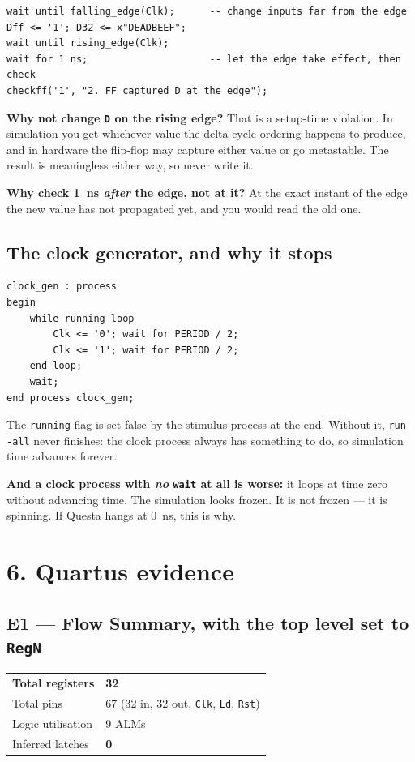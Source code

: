 \documentclass[11pt]{article}
\newcommand{\code}[1]{\texttt{#1}}
\begin{document}
\begin{lstlisting}
wait until falling_edge(Clk);      -- change inputs far from the edge
Dff <= '1'; D32 <= x"DEADBEEF";
wait until rising_edge(Clk);
wait for 1 ns;                     -- let the edge take effect, then check
checkff('1', "2. FF captured D at the edge");
\end{lstlisting}

\textbf{Why not change \code{D} on the rising edge?} That is a setup-time
violation. In simulation you get whichever value the delta-cycle ordering happens
to produce, and in hardware the flip-flop may capture either value or go
metastable. The result is meaningless either way, so never write it.

\textbf{Why check 1~ns \emph{after} the edge, not at it?} At the exact instant of
the edge the new value has not propagated yet, and you would read the old one.

\subsection*{The clock generator, and why it stops}

\begin{lstlisting}
clock_gen : process
begin
    while running loop
        Clk <= '0'; wait for PERIOD / 2;
        Clk <= '1'; wait for PERIOD / 2;
    end loop;
    wait;
end process clock_gen;
\end{lstlisting}

The \code{running} flag is set false by the stimulus process at the end. Without
it, \code{run -all} never finishes: the clock process always has something to do,
so simulation time advances forever.

\textbf{And a clock process with \emph{no} \code{wait} at all is worse:} it loops
at time zero without advancing time. The simulation looks frozen. It is not
frozen --- it is spinning. If Questa hangs at 0~ns, this is why.

\section*{6. Quartus evidence}

\subsection*{E1 --- Flow Summary, with the top level set to \code{RegN}}

\begin{center}
\begin{tabular}{ll}
\toprule
\textbf{Total registers} & \textbf{32} \\
Total pins & 67 \quad (32 in, 32 out, \code{Clk}, \code{Ld}, \code{Rst}) \\
Logic utilisation & 9 ALMs \\
Inferred latches & \textbf{0} \\
\bottomrule
\end{tabular}
\end{center}
\end{document}
